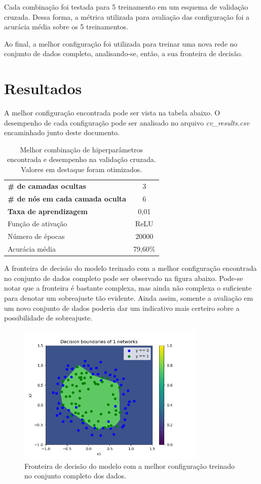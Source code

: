 \documentclass[a4paper,11pt]{article}
\begin{document}
Cada combinação foi testada para 5 treinamento em um esquema de validação cruzada. Dessa forma, a métrica utilizada para avaliação das configuração foi a acurácia média sobre os 5 treinamentos.

Ao final, a melhor configuração foi utilizada para treinar uma nova rede no conjunto de dados completo, analisando-se, então, a sua fronteira de decisão.

\section*{Resultados}

A melhor configuração encontrada pode ser vista na tabela abaixo. O desempenho de cada configuração pode ser analisado no arquivo \emph{cv\_results.csv} encaminhado junto deste documento.

\begin{table}[H]
    \centering
    \begin{tabular}{l | c}
    \textbf{\# de camadas ocultas} & 3 \\
    \textbf{\# de nós em cada camada oculta} & 6 \\
    \textbf{Taxa de aprendizagem} & 0,01 \\
    Função de ativação & ReLU \\
    Número de épocas & 20000 \\
    \hline
    Acurácia média & 79,60\%
    \end{tabular}
    \caption{Melhor combinação de hiperparâmetros encontrada e desempenho na validação cruzada. Valores em destaque foram otimizados.}
    \label{tab:label}
\end{table}

A fronteira de decisão do modelo treinado com a melhor configuração encontrada no conjunto de dados completo pode ser observado na figura abaixo. Pode-se notar que a fronteira é bastante complexa, mas ainda não complexa o suficiente para denotar um sobreajuste tão evidente. Ainda assim, somente a avaliação em um novo conjunto de dados poderia dar um indicativo mais certeiro sobre a possibilidade de sobreajuste.

\begin{figure}[H]
    \centering
    \includegraphics[width=0.8\textwidth]{imagens/decision_boundary.png}
    \caption{Fronteira de decisão do modelo com a melhor configuração treinado no conjunto completo dos dados.}
    \label{fig:imagens-decision_boundary-png}
\end{figure}
\end{document}
